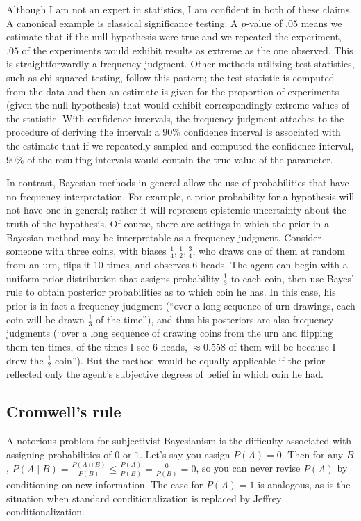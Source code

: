 \documentclass[letterpaper,12pt]{article}
\begin{document}
Although I am not an expert in statistics, I am confident in both of these claims. A canonical example is classical significance testing. A $p$-value of $.05$ means we estimate that if the null hypothesis were true and we repeated the experiment, $.05$ of the experiments would exhibit results as extreme as the one observed. This is straightforwardly a frequency judgment. Other methods utilizing test statistics, such as chi-squared testing, follow this pattern; the test statistic is computed from the data and then an estimate is given for the proportion of experiments (given the null hypothesis) that would exhibit correspondingly extreme values of the statistic. With confidence intervals, the frequency judgment attaches to the procedure of deriving the interval: a 90\% confidence interval is associated with the estimate that if we repeatedly sampled and computed the confidence interval, 90\% of the resulting intervals would contain the true value of the parameter.

In contrast, Bayesian methods in general allow the use of probabilities that have no frequency interpretation. For example, a prior probability for a hypothesis will not have one in general; rather it will represent epistemic uncertainty about the truth of the hypothesis. Of course, there are settings in which the prior in a Bayesian method may be interpretable as a frequency judgment. Consider someone with three coins, with biases $\frac{1}{4}, \frac{1}{2}, \frac{3}{4}$, who draws one of them at random from an urn, flips it 10 times, and observes 6 heads. The agent can begin with a uniform prior distribution that assigns probability $\frac{1}{3}$ to each coin, then use Bayes' rule to obtain posterior probabilities as to which coin he has. In this case, his prior is in fact a frequency judgment (``over a long sequence of urn drawings, each coin will be drawn $\frac{1}{3}$ of the time''), and thus his posteriors are also frequency judgments (``over a long sequence of drawing coins from the urn and flipping them ten times, of the times I see 6 heads, $\approx 0.558$ of them will be because I drew the $\frac{1}{2}$-coin''). But the method would be equally applicable if the prior reflected only the agent's subjective degrees of belief in which coin he had.

\subsection{Cromwell's rule}
A notorious problem for subjectivist Bayesianism is the difficulty associated with assigning probabilities of $0$ or $1$. Let's say you assign $P(A) = 0$. Then for any $B$, $P(A \mid B) = \frac{P(A \cap B)}{P(B)} \leq \frac{P(A)}{P(B)} = \frac{0}{P(B)} = 0$, so you can never revise $P(A)$ by conditioning on new information. The case for $P(A) = 1$ is analogous, as is the situation when standard conditionalization is replaced by Jeffrey conditionalization.
\end{document}
